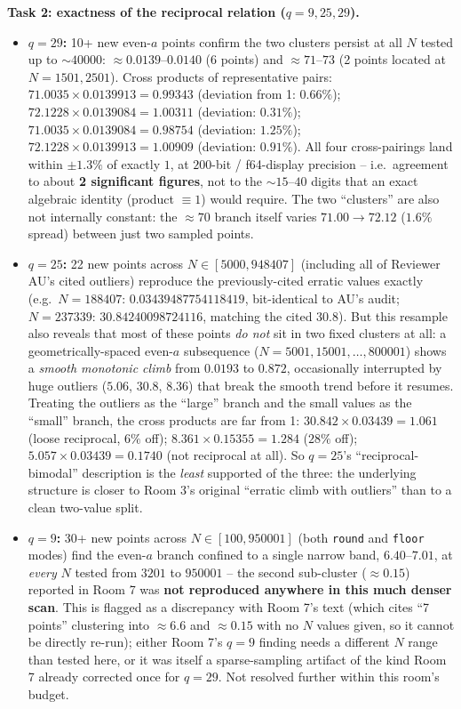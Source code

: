 \textbf{Task 2: exactness of the reciprocal relation ($q=9,25,29$).}
\begin{itemize}
\item \textbf{$q=29$:} 10+ new even-$a$ points confirm the two clusters persist at all $N$ tested
  up to $\sim40000$: $\approx0.0139$--$0.0140$ (6 points) and $\approx71$--$73$ (2 points located
  at $N=1501,2501$). Cross products of representative pairs:
  $71.0035\times0.0139913=0.99343$ (deviation from 1: $0.66\%$);
  $72.1228\times0.0139084=1.00311$ (deviation: $0.31\%$);
  $71.0035\times0.0139084=0.98754$ (deviation: $1.25\%$);
  $72.1228\times0.0139913=1.00909$ (deviation: $0.91\%$).
  All four cross-pairings land within $\pm1.3\%$ of exactly $1$, at $200$-bit / f64-display
  precision -- i.e.\ agreement to about \textbf{2 significant figures}, not to the $\sim15$--$40$
  digits that an exact algebraic identity (product $\equiv1$) would require. The two ``clusters''
  are also not internally constant: the $\approx70$ branch itself varies $71.00\to72.12$
  ($1.6\%$ spread) between just two sampled points.
\item \textbf{$q=25$:} 22 new points across $N\in[5000,948407]$ (including all of Reviewer AU's
  cited outliers) reproduce the previously-cited erratic values exactly (e.g.\ $N=188407$:
  $0.03439487754118419$, bit-identical to AU's audit; $N=237339$: $30.84240098724116$, matching
  the cited $30.8$). But this resample also reveals that most of these points \emph{do not} sit
  in two fixed clusters at all: a geometrically-spaced even-$a$ subsequence
  ($N=5001,15001,\dots,800001$) shows a \emph{smooth monotonic climb} from $0.0193$ to $0.872$,
  occasionally interrupted by huge outliers ($5.06$, $30.8$, $8.36$) that break the smooth trend
  before it resumes. Treating the outliers as the ``large'' branch and the small values as the
  ``small'' branch, the cross products are far from 1:
  $30.842\times0.03439=1.061$ (loose reciprocal, $6\%$ off);
  $8.361\times0.15355=1.284$ ($28\%$ off);
  $5.057\times0.03439=0.1740$ (not reciprocal at all).
  So $q=25$'s ``reciprocal-bimodal'' description is the \emph{least} supported of the three:
  the underlying structure is closer to Room 3's original ``erratic climb with outliers'' than to
  a clean two-value split.
\item \textbf{$q=9$:} 30+ new points across $N\in[100,950001]$ (both \texttt{round} and
  \texttt{floor} modes) find the even-$a$ branch confined to a single narrow band,
  $6.40$--$7.01$, at \emph{every} $N$ tested from $3201$ to $950001$ -- the second sub-cluster
  ($\approx0.15$) reported in Room 7 was \textbf{not reproduced anywhere in this much denser
  scan}. This is flagged as a discrepancy with Room 7's text (which cites ``7 points'' clustering
  into $\approx6.6$ and $\approx0.15$ with no $N$ values given, so it cannot be directly
  re-run); either Room 7's $q=9$ finding needs a different $N$ range than tested here, or it was
  itself a sparse-sampling artifact of the kind Room 7 already corrected once for $q=29$. Not
  resolved further within this room's budget.
\end{itemize}
